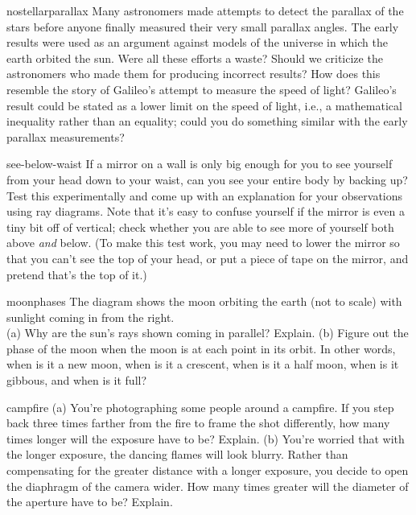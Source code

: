 \begin{hwsection}
\begin{hw}{nostellarparallax}
Many astronomers made attempts to detect the parallax
of the stars before anyone finally measured their very
small parallax angles. The early results were used as an argument
against models of the universe in which the earth
orbited the sun. Were all these efforts a waste? Should we criticize the
astronomers who made them for producing incorrect results? How does this
resemble the story of Galileo's attempt to measure the speed of light?
Galileo's result could be stated as a lower limit on the speed of light, i.e.,
a mathematical inequality rather than an equality; could you do something
similar with the early parallax measurements?
\end{hw}

\begin{hw}{see-below-waist}
If a mirror on a wall is only big enough for you to see
yourself from your head down to your waist, can you see your
entire body by backing up?  Test this experimentally and
come up with an explanation for your observations using ray diagrams. Note that
it's easy to confuse yourself if the mirror is even a tiny
bit off of vertical; check whether you are able to see more
of yourself both above \emph{and} below. (To make this test work,
you may need to lower the mirror so that you can't see the top of
your head, or put a piece of tape on the mirror, and pretend that's
the top of it.)
\end{hw}


\begin{hw}{moonphases}
The diagram shows the moon orbiting the earth (not to scale) with
sunlight coming in from the right.\\
(a) Why are the sun's rays shown coming in parallel? Explain.\hwendpart
(b) Figure out the phase of the moon when the moon is at each point
in its orbit. In other words, when is it a new moon, when is it 
a crescent, when is it a half moon, when is it gibbous, and
when is it full?
\end{hw}

\begin{hw}{campfire}
(a) You're photographing some people around a campfire. If you step back
three times farther from the fire to frame the shot differently, 
how many times longer will the exposure have to be? Explain.\hwendpart
(b) You're worried that with the longer exposure, the dancing flames will
look blurry. Rather than compensating for the greater distance with a longer
exposure, you decide to open the diaphragm of the camera wider. How many
times greater will the diameter of the aperture have to be? Explain.
\end{hw}


\end{hwsection}
